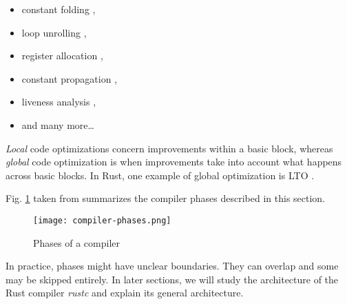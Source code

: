 \documentclass[../Thesis.tex]{subfiles}
\begin{document}
\begin{itemize}
    \item constant folding \cite[Chapter 8.5.4]{aho2014compilers},
    \item loop unrolling \cite[Chapter 10.5]{aho2014compilers},
    \item register allocation \cite[Chapter 8.1.4]{aho2014compilers},
    \item constant propagation \cite[Chapter 9]{aho2014compilers},
    \item liveness analysis \cite[Chapter 9]{aho2014compilers},
    \item and many more\ldots
\end{itemize}

\emph{Local} code optimizations concern improvements within a basic block,
whereas \emph{global} code optimization is when improvements take into account
what happens across basic blocks.
In Rust, one example of global optimization is \acrfull{LTO} \cite{huss2020}.

Fig. \ref{fig:compiler-phases} taken from \cite{aho2014compilers}
summarizes the compiler phases described in this section.

\begin{figure}[!htb]
    \centering
    \texttt{[image: compiler-phases.png]}
    \caption{Phases of a compiler}
    \label{fig:compiler-phases}
\end{figure}

In practice, phases might have unclear boundaries.
They can overlap and some may be skipped entirely.
In later sections, we will study the architecture of the Rust compiler \emph{rustc}
and explain its general architecture.
\end{document}
